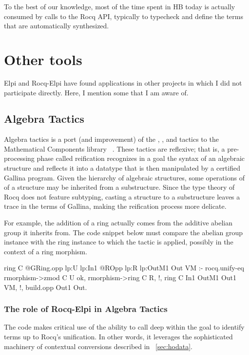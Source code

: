 \documentclass[a4paper, 11pt]{book}
\begin{document}
To the best of our knowledge, most of the time spent in HB today is actually
consumed by calls to the Rocq API, typically to typecheck and define the terms
that are automatically synthesized.

\section{Other tools}


Elpi and Rocq-Elpi have found applications in other projects in which I did not
participate directly. Here, I mention some that I am aware of.

\subsection{Algebra Tactics}

Algebra tactics is a port (and improvement) of the , ,
and  tactics to the Mathematical Components library
~\cite{sakaguchi:LIPIcs.ITP.2022.29}. These tactics are reflexive; that is, a
pre-processing phase called reification recognizes in a goal the syntax of an
algebraic structure and reflects it into a datatype that is then manipulated by
a certified Gallina program. Given the hierarchy of algebraic structures, some operations
of of a structure may be inherited from a substructure. Since the type
theory of Rocq does not feature subtyping, casting a structure to a
substructure leaves a trace in the terms of Gallina, making the reification
process more delicate.

For example, the addition of a ring actually comes from the additive abelian
group it inherits from. The code snippet below must compare the abelian group
instance  with the ring instance  to which the tactic is
applied, possibly in the context  of a ring morphism.

\begin{elpicode}
ring C {{ @GRing.opp lp:U lp:In1 }} {{ @ROpp lp:R lp:OutM1 }} Out VM :-
  rocq.unify-eq { rmorphism->zmod C } U ok,
  rmorphism->ring C R, !,
  ring C In1 OutM1 Out1 VM, !,
  build.opp Out1 Out.  
\end{elpicode}

\subsubsection{The role of Rocq-Elpi in Algebra Tactics}


The code makes critical use of the ability to call  deep
within the goal to identify terms up to Rocq's unification. In other words, it
leverages the sophisticated machinery of contextual conversions described in
~\cref{sec:hodata}.
\end{document}
